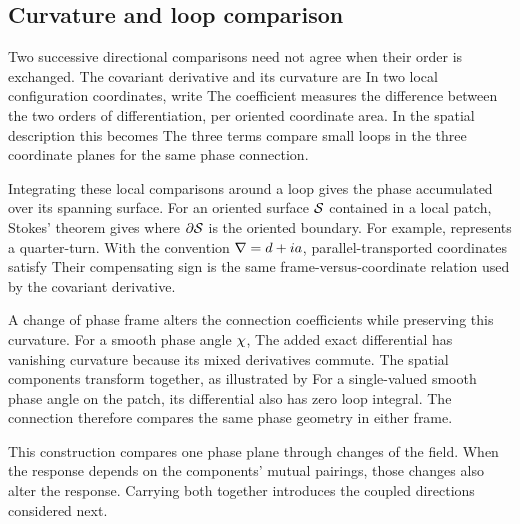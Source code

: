 \subsection{Curvature and loop comparison}
Two successive directional comparisons need not agree when their order is exchanged. The covariant derivative and its curvature are
\PhaseUnitaryConnectionDisplay
In two local configuration coordinates, write
\PhaseCurvatureCoordinatesDisplay
The coefficient measures the difference between the two orders of differentiation, per oriented coordinate area. In the spatial description this becomes
\FieldSpatialCurvatureDisplay
The three terms compare small loops in the three coordinate planes for the same phase connection.

Integrating these local comparisons around a loop gives the phase accumulated over its spanning surface. For an oriented surface $\mathcal S$ contained in a local patch, Stokes' theorem gives
\PhaseLoopPhaseDisplay
where $\partial\mathcal S$ is the oriented boundary. For example,
\PhaseLoopExampleDisplay
represents a quarter-turn. With the convention $\nabla=d+ia$, parallel-transported coordinates satisfy
\PhaseParallelTransportDisplay
Their compensating sign is the same frame-versus-coordinate relation used by the covariant derivative.

A change of phase frame alters the connection coefficients while preserving this curvature. For a smooth phase angle $\chi$,
\PhasePhaseGaugeDisplay
The added exact differential has vanishing curvature because its mixed derivatives commute. The spatial components transform together,
\FieldSpatialGaugeDisplay
as illustrated by
\PhaseGaugeExampleDisplay
For a single-valued smooth phase angle on the patch, its differential also has zero loop integral. The connection therefore compares the same phase geometry in either frame.

This construction compares one phase plane through changes of the field. When the response depends on the components' mutual pairings, those changes also alter the response. Carrying both together introduces the coupled directions considered next.
